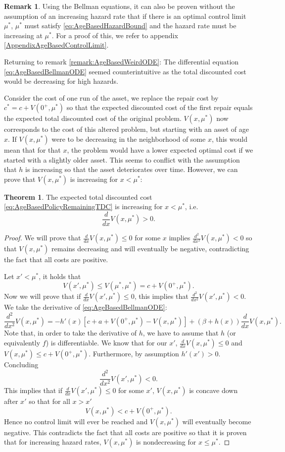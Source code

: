 \documentclass[a4paper]{thesis}
\theoremstyle{definition}
\newtheorem{remark}{Remark}[chapter]
\newtheorem{theorem}{Theorem}[chapter]
\begin{document}
\begin{remark}
	Using the Bellman equations, it can also be proven without the assumption of an increasing hazard rate that if there is an optimal control limit $\mu^*$, $\mu^*$ must satisfy \eqref{eq:AgeBasedHazardBound} and the hazard rate must be increasing at $\mu^*$.
	For a proof of this, we refer to appendix \ref{AppendixAgeBasedControlLimit}.
\end{remark}

	Returning to remark \ref{remark:AgeBasedWeirdODE}:
	The differential equation \eqref{eq:AgeBasedBellmanODE} seemed counterintuitive as the total discounted cost would be decreasing for high hazards.
	
	Consider the cost of one run of the asset, we replace the repair cost by $c^*=c+V(0^+,\mu^*)$ so that the expected discounted cost of the first repair equals the expected total discounted cost of the original problem.
	$V(x,\mu^*)$ now corresponds to the cost of this altered problem, but starting with an asset of age $x$.
	If $V(x,\mu^*)$ were to be decreasing in the neighborhood of some $x$, this would mean that for that $x$, the problem would have a lower expected optimal cost if we started with a slightly older asset.
	This seems to conflict with the assumption that $h$ is increasing so that the asset deteriorates over time.
	However, we can prove that $V(x,\mu^*)$ is increasing for $x<\mu^*$:

\begin{theorem}\label{theorem:TdcNonDecreasing}
	The expected total discounted cost \eqref{eq:AgeBasedPolicyRemainingTDC} is increasing for $x< \mu^*$, i.e.
	\[
	\frac{d}{dx}V(x,\mu^*)> 0.
	\]
	\begin{proof}
		We will prove that $\frac{d}{dx}V(x,\mu^*)\leq0$ for some $x$ implies $\frac{d^2}{dx^2}V(x,\mu^*)<0$ so that $V(x,\mu^*)$ remains decreasing and will eventually be negative, contradicting the fact that all costs are positive.
		
		Let $x'<\mu^*$, it holds that
		\[
		V(x',\mu^*)\leq V(\mu^*,\mu^*)=c+V(0^+,\mu^*).
		\]
		Now we will prove that if $\frac{d}{dx}V(x',\mu^*)\leq 0$, this implies that $\frac{d^2}{dx^2}V(x',\mu^*)<0$.
		We take the derivative of \eqref{eq:AgeBasedBellmanODE}:
		\[
		\frac{d^2}{dx^2}V(x,\mu^*)=-h'(x)[c+a+V(0^+,\mu^*)-V(x,\mu^*)]+(\beta+h(x))\frac{d}{dx}V(x,\mu^*).
		\]
		Note that, in order to take the derivative of $h$, we have to assume that $h$ (or equivalently $f$) is differentiable.
		We know that for our $x'$, $\frac{d}{dx}V(x,\mu^*)\leq 0$ and $V(x,\mu^*)\leq c+V(0^+,\mu^*)$.
		Furthermore, by assumption $h'(x')>0$.
		Concluding
		\[
		\frac{d^2}{dx^2}V(x',\mu^*)<0.
		\]
		This implies that if $\frac{d}{dx}V(x',\mu^*)\leq0$ for some $x'$, $V(x,\mu^*)$ is concave down after $x'$ so that for all $x>x'$
		\[
		V(x,\mu^*)< c+V(0^+,\mu^*).
		\]
		Hence no control limit will ever be reached and $V(x,\mu^*)$ will eventually become negative.
		This contradicts the fact that all costs are positive so that it is proven that for increasing hazard rates, $V(x,\mu^*)$ is nondecreasing for $x\leq\mu^*$.
	\end{proof}
\end{theorem}
\end{document}

